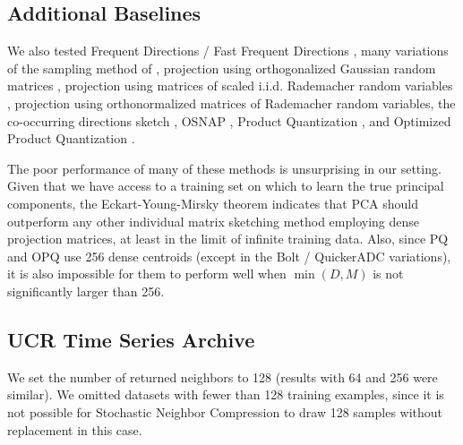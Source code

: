 \subsection{Additional Baselines}

We also tested Frequent Directions / Fast Frequent Directions \cite{liberty_simple_2012, ghashami_frequent_2016, isvd}, many variations of the sampling method of \citet{drineas_fast_2006}, projection using orthogonalized Gaussian random matrices \cite{superbitLSH}, projection using matrices of scaled i.i.d. Rademacher random variables \cite{rademacherJL}, projection using orthonormalized matrices of Rademacher random variables, the co-occurring directions sketch \cite{mroueh_co-occuring_2016}, OSNAP \cite{osnap}, Product Quantization \cite{pq}, and Optimized Product Quantization \cite{opq}.

The poor performance of many of these methods is unsurprising in our setting. Given that we have access to a training set on which to learn the true principal components, the Eckart-Young-Mirsky theorem \cite{eckartYoungMirskyThm} indicates that PCA should outperform any other individual matrix sketching method employing dense projection matrices, at least in the limit of infinite training data. Also, since PQ and OPQ use 256 dense centroids (except in the Bolt / QuickerADC variations), it is also impossible for them to perform well when $\min(D, M)$ is not significantly larger than 256.

\subsection{UCR Time Series Archive}

We set the number of returned neighbors to 128 (results with 64 and 256 were similar). We omitted datasets with fewer than 128 training examples, since it is not possible for Stochastic Neighbor Compression to draw 128 samples without replacement in this case.


